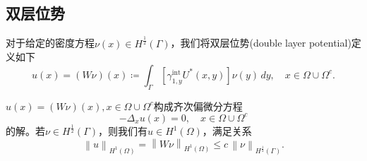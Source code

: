 \subsection{双层位势}
\label{sec:bvp-double-layer-potential}
对于给定的密度方程$\nu(x) \in H^{\frac{1}{2}}(\Gamma)$，我们将双层位势(double layer potential)定义如下
\begin{equation}
  \label{eq:bvp-double-layer-potential-def}
  u(x) = \left( W \nu \right)(x) \coloneqq
  \int_{\Gamma}
  \left[
  \gamma_{1,y}^{\text{int}} U^{*}(x,y)
  \right]
  \nu(y) \, dy, \quad x \in \Omega \cup \Omega^{c}.
\end{equation}

\begin{lemma}
\label{lemma:bvp-double-layer-potential-solution}
$u(x) = \left(W \nu \right)(x), x \in \Omega \cup \Omega^{c}$构成齐次偏微分方程
\begin{equation*}
  - \Delta_{x} u(x) = 0, \quad x \in \Omega \cup \Omega^{c}
\end{equation*}
的解。若$\nu \in H^{\frac{1}{2}}(\Gamma)$，则我们有$u \in H^{1}(\Omega)$，满足关系
\begin{equation*}
  \left\| u \right\|_{H^{1}(\Omega)} =
  \left\| W \nu \right\|_{H^{1}(\Omega)}
  \le c \, \left\| \nu \right\|_{H^{\frac{1}{2}}(\Gamma)}.
\end{equation*}
\end{lemma}

